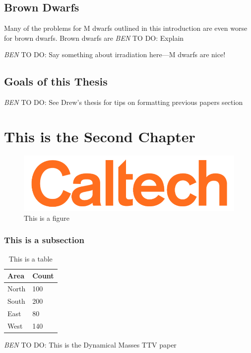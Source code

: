 \documentclass[12pt]{caltech_thesis}
\newcommand{\todo}[3]{{\color{#2} \emph{#1} TO DO: #3}}
\newcommand{\btmtodo}[1]{\todo{BEN}{red}{#1}}
\begin{document}
\section{Brown Dwarfs}
Many of the problems for M dwarfs outlined in this introduction are even worse for
brown dwarfs.
Brown dwarfs are \btmtodo{Explain}

\btmtodo{Say something about irradiation here---M dwarfs are nice!}

\section{Goals of this Thesis} 

\btmtodo{See Drew's thesis for tips on formatting previous papers section}







\chapter{This is the Second Chapter}


\begin{figure}[hbt!]
\centering
\includegraphics[width=.3\textwidth]{caltech.png}
\caption[Example Figure]{This is a figure}
\label{fig:logo}
\end{figure}

\subsection{This is a subsection}

\begin{table}[hbt!]
\centering
\begin{tabular}{ll}
\hline
Area & Count\\
\hline
North & 100\\
South & 200\\
East & 80\\
West & 140\\
\hline
\end{tabular}
\caption[Table]{This is a table}
\label{tab:sample}
\end{table}



\btmtodo{This is the Dynamical Masses TTV paper}
\end{document}

